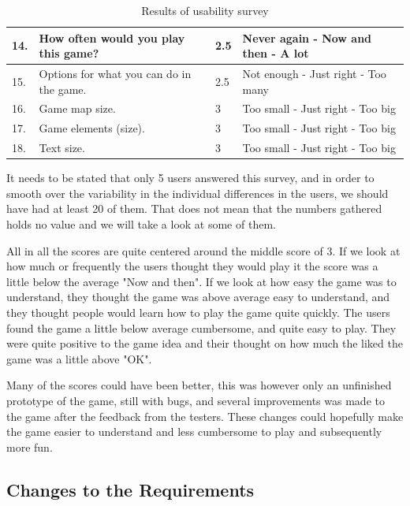 \begin{table}[H]
\begin{tabular}{| l | p{5cm} | p{1cm} | p{5cm} |}
		14. & How often would you play this game? & 2.5 & Never again - Now and then - A lot \\ \hline

		15. & Options for what you can do in the game. & 2.5 & Not enough - Just right - Too many \\ \hline

		16. & Game map size. & 3 & Too small - Just right - Too big \\ \hline

		17. & Game elements (size). & 3 & Too small - Just right - Too big \\ \hline

		18. & Text size. & 3 & Too small - Just right - Too big \\ \hline
	\end{tabular}
	\caption{Results of usability survey}
	\label{table:usabilitysurveyresult}
	\end{table}

	It needs to be stated that only 5 users answered this survey, and in order to smooth over the 
	variability in the individual differences in the users, we should have had at least 20 of them. 
	\cite{quantitativeTest} That does not mean that the numbers gathered holds no value and we will take a look at some of them. 

	All in all the scores are quite centered around the middle score of 3. If we look at how much or frequently the users thought they would play it the score was a little below the average "Now and then". If we look at how easy the game was to understand, they thought the game was above average easy to understand, and they thought people would learn how to play the game quite quickly. The users found the game a little below average cumbersome, and quite easy to play. They were quite positive to the game idea and their thought on how much the liked the game was a little above "OK".

	Many of the scores could have been better, this was however only an unfinished prototype of the game, still with bugs, and several improvements was made to the game after the feedback from the testers. These changes could hopefully make the game easier to understand and less cumbersome to play and subsequently more fun.

\subsection{Changes to the Requirements}

